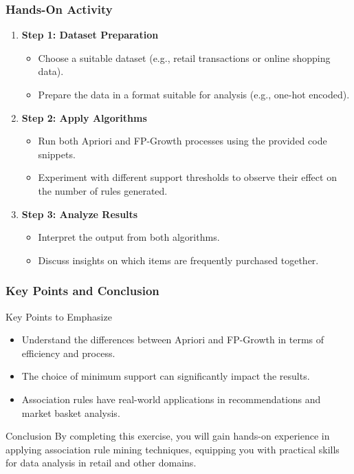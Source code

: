 \documentclass[aspectratio=169]{beamer}
\begin{document}
\begin{frame}[fragile]
    \frametitle{Hands-On Activity}
    \begin{enumerate}
        \item \textbf{Step 1: Dataset Preparation}
        \begin{itemize}
            \item Choose a suitable dataset (e.g., retail transactions or online shopping data).
            \item Prepare the data in a format suitable for analysis (e.g., one-hot encoded).
        \end{itemize}

        \item \textbf{Step 2: Apply Algorithms}
        \begin{itemize}
            \item Run both Apriori and FP-Growth processes using the provided code snippets.
            \item Experiment with different support thresholds to observe their effect on the number of rules generated.
        \end{itemize}

        \item \textbf{Step 3: Analyze Results}
        \begin{itemize}
            \item Interpret the output from both algorithms.
            \item Discuss insights on which items are frequently purchased together.
        \end{itemize}
    \end{enumerate}
\end{frame}

\begin{frame}[fragile]
    \frametitle{Key Points and Conclusion}
    \begin{block}{Key Points to Emphasize}
        \begin{itemize}
            \item Understand the differences between Apriori and FP-Growth in terms of efficiency and process.
            \item The choice of minimum support can significantly impact the results.
            \item Association rules have real-world applications in recommendations and market basket analysis.
        \end{itemize}
    \end{block}

    \begin{block}{Conclusion}
        By completing this exercise, you will gain hands-on experience in applying association rule mining techniques, equipping you with practical skills for data analysis in retail and other domains.
    \end{block}
\end{frame}
\end{document}
